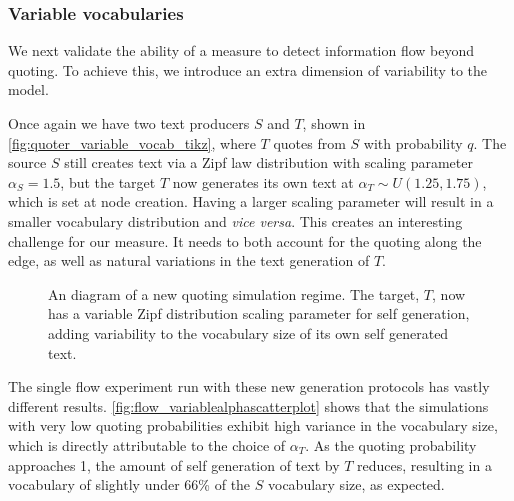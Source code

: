\subsubsection{Variable vocabularies}
We next validate the ability of a measure to detect information flow beyond quoting. To achieve this, we introduce an extra dimension of variability to the model. 

Once again we have two text producers $S$ and $T$, shown in \autoref{fig:quoter_variable_vocab_tikz}, where $T$ quotes from $S$ with probability $q$. The source $S$ still creates text via a Zipf law distribution with scaling parameter $\alpha_S=1.5$, but the target $T$ now generates its own text at $\alpha_T \sim U(1.25,1.75)$, which is set at node creation. Having a larger scaling parameter will result in a smaller vocabulary distribution and \emph{vice versa}. This creates an interesting challenge for our measure. It needs to both account for the quoting along the edge, as well as natural variations in the text generation of $T$.

\begin{figure}[!htbp]
\centering
{}
\caption{An diagram of a new quoting simulation regime. The target, $T$, now has a variable Zipf distribution scaling parameter for self generation, adding variability to the vocabulary size of its own self generated text.}\label{fig:quoter_variable_vocab_tikz}
\end{figure}

The single flow experiment run with these new generation protocols has vastly different results. \autoref{fig:flow_variablealphascatterplot} shows that the simulations with very low quoting probabilities exhibit high variance in the vocabulary size, which is directly attributable to the choice of $\alpha_T$. As the quoting probability approaches 1, the amount of self generation of text by $T$ reduces, resulting in a vocabulary of slightly under 66\% of the $S$ vocabulary size, as expected.


